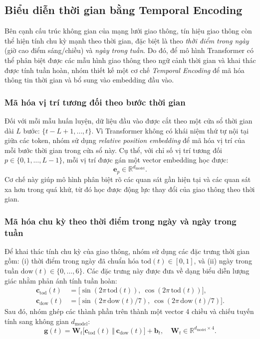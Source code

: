 \subsection{Biểu diễn thời gian bằng Temporal Encoding}
\label{subsec:temporal_encoding}

Bên cạnh cấu trúc không gian của mạng lưới giao thông, tín hiệu giao thông còn thể hiện tính
chu kỳ mạnh theo thời gian, đặc biệt là theo \textit{thời điểm trong ngày} (giờ cao điểm sáng/chiều)
và \textit{ngày trong tuần}. Do đó, để mô hình Transformer có thể phân biệt được các mẫu hình
giao thông theo ngữ cảnh thời gian và khai thác được tính tuần hoàn, nhóm thiết kế một cơ chế
\textit{Temporal Encoding} để mã hóa thông tin thời gian và bổ sung vào embedding đầu vào.

\subsubsection{Mã hóa vị trí tương đối theo bước thời gian}
\label{subsubsec:relative_pos}

Đối với mỗi mẫu huấn luyện, dữ liệu đầu vào được cắt theo một cửa sổ thời gian dài $L$ bước:
$\{t-L+1,\dots,t\}$. Vì Transformer không có khái niệm thứ tự nội tại giữa các token, nhóm sử dụng
\textit{relative position embedding} để mã hóa vị trí của mỗi bước thời gian trong cửa sổ này.
Cụ thể, với chỉ số vị trí tương đối $p \in \{0,1,\dots,L-1\}$, mỗi vị trí được gán một vector embedding
học được:
\begin{equation}
\mathbf{e}_p \in \mathbb{R}^{d_{\text{model}}}.
\end{equation}
Cơ chế này giúp mô hình phân biệt rõ các quan sát gần hiện tại và các quan sát xa hơn trong quá khứ,
từ đó học được động lực thay đổi của giao thông theo thời gian.

\subsubsection{Mã hóa chu kỳ theo thời điểm trong ngày và ngày trong tuần}
\label{subsubsec:cyclic_time_features}

Để khai thác tính chu kỳ của giao thông, nhóm sử dụng các đặc trưng thời gian gồm:
(i) thời điểm trong ngày đã chuẩn hóa $\text{tod}(t) \in [0,1]$, và
(ii) ngày trong tuần $\text{dow}(t) \in \{0,\dots,6\}$.
Các đặc trưng này được đưa về dạng biểu diễn lượng giác nhằm phản ánh tính tuần hoàn:
\begin{align}
\mathbf{c}_{\text{tod}}(t) &= \big[\sin(2\pi\,\text{tod}(t)),\ \cos(2\pi\,\text{tod}(t))\big],\\
\mathbf{c}_{\text{dow}}(t) &= \big[\sin(2\pi\,\text{dow}(t)/7),\ \cos(2\pi\,\text{dow}(t)/7)\big].
\end{align}
Sau đó, nhóm ghép các thành phần trên thành một vector 4 chiều và chiếu tuyến tính sang không gian
$d_{\text{model}}$:
\begin{equation}
\mathbf{g}(t) = \mathbf{W}_t \big[\mathbf{c}_{\text{tod}}(t)\ \Vert\ \mathbf{c}_{\text{dow}}(t)\big] + \mathbf{b}_t,
\quad \mathbf{W}_t \in \mathbb{R}^{d_{\text{model}} \times 4}.
\end{equation}

